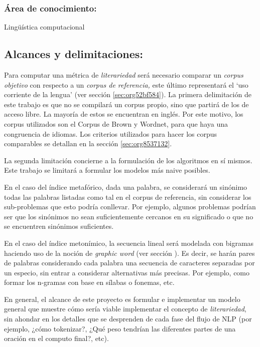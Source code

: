 \documentclass[12pt,letterpaper,twoside]{article}
\begin{document}
\subsubsection{\textbf{Área de conocimiento:}}
\label{sec:orgb49c6e4}

Lingüística computacional

\subsection{Alcances y delimitaciones:}
\label{sec:org94fe62a}

Para computar una métrica de \emph{literariedad} será necesario comparar un
\emph{corpus objetivo} con respecto a un \emph{corpus de referencia,} este
último representará el ‘uso corriente de la lengua' (ver sección
\ref{sec:org52bf584}). La primera delimitación de este trabajo es que no se
compilará un corpus propio, sino que partirá de los de acceso
libre. La mayoría de estos se encuentran en inglés. Por este motivo,
los corpus utilizados son el Corpus de Brown y Wordnet, para
que haya una congruencia de idiomas. Los criterios
utilizados para hacer los corpus comparables se detallan en la sección
\ref{sec:org8537132}.

La segunda limitación concierne a la formulación de los algoritmos en
sí mismos. Este trabajo se limitará a formular los modelos más naive
posibles.

En el caso del índice metafórico, dada una palabra, se
considerará un sinónimo todas las palabras listadas como tal en el
corpus de referencia, sin considerar los sub-problemas que esto podría
conllevar. Por ejemplo, algunos problemas podrían ser que los
sinónimos no sean suficientemente cercanos en su significado o que no
se encuentren sinónimos suficientes.

En el caso del índice metonímico, la secuencia lineal será modelada
con bigramas haciendo uso de la noción de \emph{graphic word} (ver sección
).  Es decir, se harán pares de palabras considerando cada
palabra una secuencia de caracteres separadas por un especio, sin
entrar a considerar alternativas más precisas. Por ejemplo, como
formar los n-gramas con base en sílabas o fonemas, etc.

En general, el alcance de este proyecto es formular e implementar un
modelo general que muestre cómo sería viable implementar el concepto de
\emph{literariedad}, sin ahondar en los detalles que se desprenden de cada
fase del flujo de NLP (por ejemplo, ¿cómo tokenizar?, ¿Qué peso tendrían
las diferentes partes de una oración en el computo final?, etc).
\end{document}
